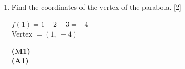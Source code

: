\documentclass[12pt, twoside]{article}
\begin{document}
\begin{enumerate}[itemsep=0.2cm]
\begin{enumerate}[itemsep=0.3cm]
  \medskip
  \item Find the coordinates of the vertex of the parabola. \hfill [2]

  \begin{minipage}[t]{0.62\textwidth}
  $f(1) = 1 - 2 - 3 = -4$\\[0.15cm]
  Vertex $= (1,\; -4)$
  \end{minipage}%
  \begin{minipage}[t]{0.35\textwidth}\raggedleft
  \textbf{(M1)}\\[0.15cm]
  \textbf{(A1)}
  \end{minipage}
\end{enumerate}

\end{enumerate}
\end{document}
